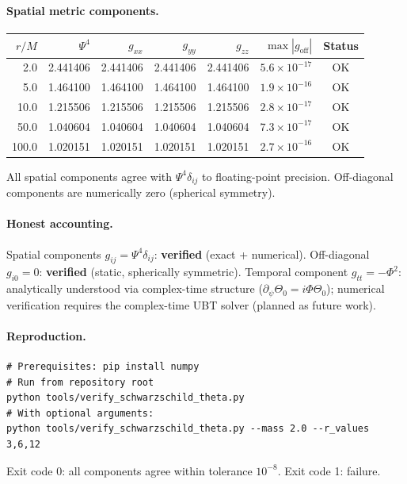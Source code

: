\documentclass[12pt,a4paper]{article}
\theoremstyle{definition}
\theoremstyle{remark}
\begin{document}
\paragraph{Spatial metric components.}

\begin{center}
\begin{tabular}{rrrrrrc}
\toprule
$r/M$ & $\Psi^4$ & $g_{xx}$ & $g_{yy}$ & $g_{zz}$ & $\max|g_\mathrm{off}|$ & Status \\
\midrule
2.0   & 2.441406 & 2.441406 & 2.441406 & 2.441406 & $5.6\times10^{-17}$ & OK \\
5.0   & 1.464100 & 1.464100 & 1.464100 & 1.464100 & $1.9\times10^{-16}$ & OK \\
10.0  & 1.215506 & 1.215506 & 1.215506 & 1.215506 & $2.8\times10^{-17}$ & OK \\
50.0  & 1.040604 & 1.040604 & 1.040604 & 1.040604 & $7.3\times10^{-17}$ & OK \\
100.0 & 1.020151 & 1.020151 & 1.020151 & 1.020151 & $2.7\times10^{-16}$ & OK \\
\bottomrule
\end{tabular}
\end{center}

All spatial components agree with $\Psi^4\delta_{ij}$ to floating-point precision.
Off-diagonal components are numerically zero (spherical symmetry).

\paragraph{Honest accounting.}
Spatial components $g_{ij} = \Psi^4\delta_{ij}$: \textbf{verified} (exact + numerical).
Off-diagonal $g_{i0} = 0$: \textbf{verified} (static, spherically symmetric).
Temporal component $g_{tt} = -\Phi^2$: analytically understood via complex-time
structure ($\partial_\psi\Theta_0 = i\Phi\Theta_0$); numerical verification
requires the complex-time UBT solver (planned as future work).

\paragraph{Reproduction.}
\begin{verbatim}
# Prerequisites: pip install numpy
# Run from repository root
python tools/verify_schwarzschild_theta.py
# With optional arguments:
python tools/verify_schwarzschild_theta.py --mass 2.0 --r_values 3,6,12
\end{verbatim}
Exit code 0: all components agree within tolerance $10^{-8}$.
Exit code 1: failure.



\end{document}
